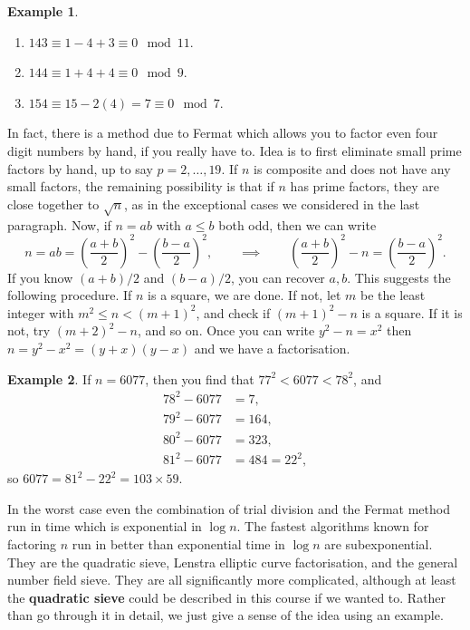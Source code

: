 \documentclass{article}
\newcommand{\rb}[1]{\left( #1 \right)}
\theoremstyle{definition}\newtheorem{definition}{Definition}
\theoremstyle{definition}\newtheorem{remark}[definition]{Remark}
\theoremstyle{definition}\newtheorem*{example}{Example}
\theoremstyle{definition}\newtheorem*{note}{Note}
\begin{document}
\begin{example}
\hfill
\begin{enumerate}
\item $ 143 \equiv 1 - 4 + 3 \equiv 0 \mod 11 $.
\item $ 144 \equiv 1 + 4 + 4 \equiv 0 \mod 9 $.
\item $ 154 \equiv 15 - 2\rb{4} = 7 \equiv 0 \mod 7 $.
\end{enumerate}
\end{example}


In fact, there is a method due to Fermat which allows you to factor even four digit numbers by hand, if you really have to. Idea is to first eliminate small prime factors by hand, up to say $ p = 2, \dots, 19 $. If $ n $ is composite and does not have any small factors, the remaining possibility is that if $ n $ has prime factors, they are close together to $ \sqrt{n} $, as in the exceptional cases we considered in the last paragraph. Now, if $ n = ab $ with $ a \le b $ both odd, then we can write
$$ n = ab = \rb{\dfrac{a + b}{2}}^2 - \rb{\dfrac{b - a}{2}}^2, \qquad \implies \qquad \rb{\dfrac{a + b}{2}}^2 - n = \rb{\dfrac{b - a}{2}}^2. $$
If you know $ \rb{a + b} / 2 $ and $ \rb{b - a} / 2 $, you can recover $ a, b $. This suggests the following procedure. If $ n $ is a square, we are done. If not, let $ m $ be the least integer with $ m^2 \le n < \rb{m + 1}^2 $, and check if $ \rb{m + 1}^2 - n $ is a square. If it is not, try $ \rb{m + 2}^2 - n $, and so on. Once you can write $ y^2 - n = x^2 $ then $ n = y^2 - x^2 = \rb{y + x}\rb{y - x} $ and we have a factorisation.

\begin{example}
If $ n  = 6077 $, then you find that $ 77^2 < 6077 < 78^2 $, and
\begin{align*}
78^2 - 6077 & = 7, \\
79^2 - 6077 & = 164, \\
80^2 - 6077 & = 323, \\
81^2 - 6077 & = 484 = 22^2,
\end{align*}
so $ 6077 = 81^2 - 22^2 = 103 \times 59 $.
\end{example}

In the worst case even the combination of trial division and the Fermat method run in time which is exponential in $ \log n $. The fastest algorithms known for factoring $ n $ run in better than exponential time in $ \log n $ are subexponential. They are the quadratic sieve, Lenstra elliptic curve factorisation, and the general number field sieve. They are all significantly more complicated, although at least the \textbf{quadratic sieve} could be described in this course if we wanted to. Rather than go through it in detail, we just give a sense of the idea using an example.
\end{document}
